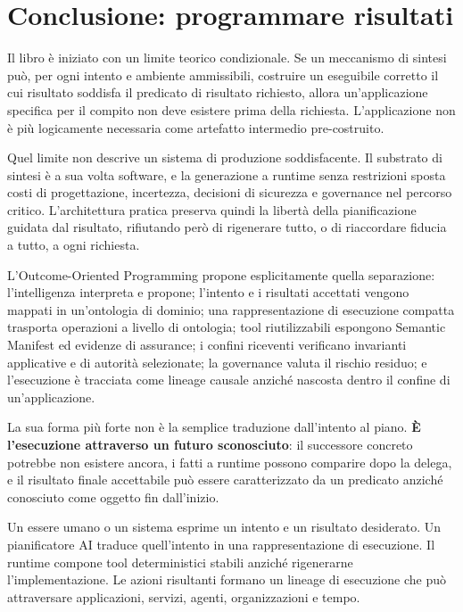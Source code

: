 \documentclass[10pt,oneside,openany]{book}
\begin{document}
\chapter{Conclusione: programmare risultati}

Il libro è iniziato con un limite teorico condizionale. Se un meccanismo di sintesi può, per ogni intento e ambiente ammissibili, costruire un eseguibile corretto il cui risultato soddisfa il predicato di risultato richiesto, allora un'applicazione specifica per il compito non deve esistere prima della richiesta. L'applicazione non è più logicamente necessaria come artefatto intermedio pre-costruito.

Quel limite non descrive un sistema di produzione soddisfacente. Il substrato di sintesi è a sua volta software, e la generazione a runtime senza restrizioni sposta costi di progettazione, incertezza, decisioni di sicurezza e governance nel percorso critico. L'architettura pratica preserva quindi la libertà della pianificazione guidata dal risultato, rifiutando però di rigenerare tutto, o di riaccordare fiducia a tutto, a ogni richiesta.

L'Outcome-Oriented Programming propone esplicitamente quella separazione: l'intelligenza interpreta e propone; l'intento e i risultati accettati vengono mappati in un'ontologia di dominio; una rappresentazione di esecuzione compatta trasporta operazioni a livello di ontologia; tool riutilizzabili espongono Semantic Manifest ed evidenze di assurance; i confini riceventi verificano invarianti applicative e di autorità selezionate; la governance valuta il rischio residuo; e l'esecuzione è tracciata come lineage causale anziché nascosta dentro il confine di un'applicazione.

La sua forma più forte non è la semplice traduzione dall'intento al piano. \textbf{È l'esecuzione attraverso un futuro sconosciuto}: il successore concreto potrebbe non esistere ancora, i fatti a runtime possono comparire dopo la delega, e il risultato finale accettabile può essere caratterizzato da un predicato anziché conosciuto come oggetto fin dall'inizio.

Un essere umano o un sistema esprime un intento e un risultato desiderato. Un pianificatore AI traduce quell'intento in una rappresentazione di esecuzione. Il runtime compone tool deterministici stabili anziché rigenerarne l'implementazione. Le azioni risultanti formano un lineage di esecuzione che può attraversare applicazioni, servizi, agenti, organizzazioni e tempo.
\end{document}
